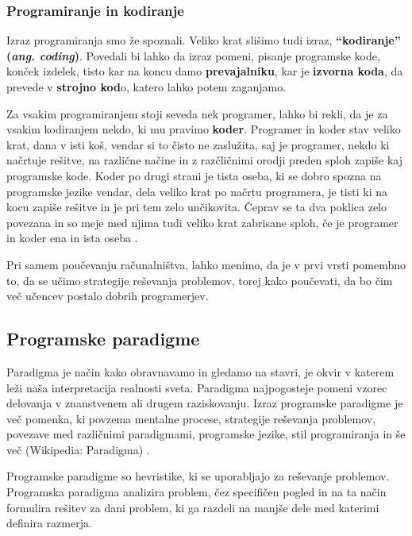 \subsubsection{Programiranje in kodiranje}
\label{sec:programiranje_kodiranje}

Izraz programiranja smo že spoznali. Veliko krat slišimo tudi izraz,
\textbf{``kodiranje'' (\emph{ang. coding})}. Povedali bi lahko da
izraz pomeni, pisanje programske kode, konček izdelek, tisto kar na
koncu damo \textbf{prevajalniku}, kar je \textbf{izvorna koda}, da
prevede v \textbf{strojno kod}o, katero lahko potem zaganjamo.

Za vsakim programiranjem stoji seveda nek programer, lahko bi rekli,
da je za vsakim kodiranjem nekdo, ki mu pravimo
\textbf{koder}. Programer in koder stav veliko krat, dana v isti koš,
vendar si to čisto ne zaslužita, saj je programer, nekdo ki načrtuje
rešitve, na različne načine in z razčličnimi orodji preden sploh
zapiše kaj programske kode. Koder po drugi strani je tista oseba, ki
se dobro spozna na programske jezike vendar, dela veliko krat po
načrtu programera, je tisti ki na kocu zapiše rešitve in je pri tem
zelo unčikovita. Čeprav se ta dva poklica zelo povezana in so meje med
njima tudi veliko krat zabrisane sploh, če je programer in koder ena
in ista oseba \cite{web:coder}.

Pri samem poučevanju računalništva, lahko menimo, da je v prvi vrsti
pomembno to, da se učimo strategije reševanja problemov, torej kako
poučevati, da bo čim več učencev postalo dobrih programerjev.

\subsection{Programske paradigme}
\label{sec:programske_paradigme}

Paradigma je način kako obravnavamo in gledamo na stavri, je okvir v
katerem leži naša interpretacija realnosti sveta. Paradigma
najpogosteje pomeni vzorec delovanja v znanstvenem ali drugem
raziskovanju.  Izraz programske paradigme je več pomenka, ki povzema
mentalne procese, strategije reševanja problemov, povezave med
različnimi paradigmami, programske jezike, stil programiranja in še
več (Wikipedia: Paradigma) \cite{guideTCS}.

Programske paradigme so hevristike, ki se uporabljajo za reševanje
problemov. Programska paradigma analizira problem, čez specifičen
pogled in na ta način formulira rešitev za dani problem, ki ga razdeli
na manjše dele med katerimi definira razmerja.


